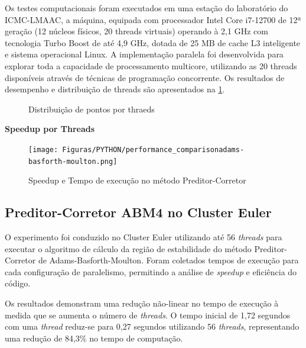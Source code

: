 \documentclass[a4paper,12pt]{article}
\begin{document}
Os testes computacionais foram executados em uma estação do laboratório do ICMC-LMAAC, a máquina, equipada com processador Intel Core i7-12700 de 12ª geração (12 núcleos físicos, 20 threads virtuais) operando à 2,1 GHz com tecnologia Turbo Boost de até 4,9 GHz, dotada de 25 MB de cache L3 inteligente e sistema operacional Linux. A implementação paralela foi desenvolvida para explorar toda a capacidade de processamento multicore, utilizando as 20 threads disponíveis através de técnicas de programação concorrente. Os resultados de desempenho e distribuição de threads são apresentados na \ref{fig:pre-cor3-4}.

\begin{figure}[H]
	\centering
	\quad %
	\caption{Distribuição de pontos por thraeds}
	\label{fig:pre-cor3-4}
\end{figure}

\textbf{Speedup por Threads}

\begin{figure}[H]
	\centering
	\texttt{[image: Figuras/PYTHON/performance\_comparisonadams-basforth-moulton.png]}
	\caption{Speedup e Tempo de execução no método Preditor-Corretor}
	\label{fig:speed_threads_PC4_lmacc}
\end{figure}


\subsection{Preditor-Corretor ABM4 no Cluster Euler}

O experimento foi conduzido no Cluster Euler utilizando até 56 \textit{threads} para executar o algoritmo de cálculo da região de estabilidade do método  Preditor-Corretor de Adams-Basforth-Moulton. Foram coletados tempos de execução para cada configuração de paralelismo, permitindo a análise de \textit{speedup} e eficiência do código.

Os resultados demonstram uma redução não-linear no tempo de execução à medida que se aumenta o número de \textit{threads}. O tempo inicial de 1,72 segundos com uma \textit{thread} reduz-se para 0,27 segundos utilizando 56 \textit{threads}, representando uma redução de 84,3\% no tempo de computação.
\end{document}
